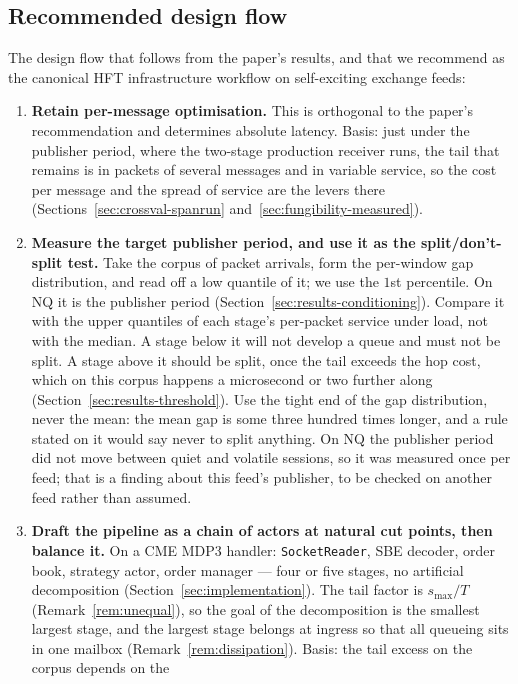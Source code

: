 \documentclass[11pt]{article}
\begin{document}
\subsection{Recommended design flow}

The design flow that follows from the paper's results, and that we recommend as the
canonical HFT infrastructure workflow on self-exciting exchange feeds:
\begin{enumerate}
    \item \textbf{Retain per-message optimisation.} This is orthogonal to the paper's
recommendation and determines absolute latency. Basis: just under the publisher period,
where the two-stage production receiver runs, the tail that remains is in packets of several messages
and in variable service, so the cost per message and the spread of service are the
levers there (Sections~\ref{sec:crossval-spanrun} and~\ref{sec:fungibility-measured}).
    \item \textbf{Measure the target publisher period, and use it as the split/don't-split
test.} Take the corpus of packet arrivals, form the per-window gap distribution, and read
off a low quantile of it; we use the $1$st percentile. On NQ it is the publisher period
(Section~\ref{sec:results-conditioning}). Compare it with the upper quantiles of each
stage's per-packet service under load, not with the median. A stage below it will not
develop a queue and must not be split. A stage above it should be split, once the tail
exceeds the hop cost, which on this corpus happens a microsecond or two further along
(Section~\ref{sec:results-threshold}). Use the tight end of the gap distribution, never
the mean: the mean gap is some three hundred times longer, and a rule stated on it would
say never to split anything. On NQ the publisher period did not move between quiet and
volatile sessions, so it was measured once per feed; that is a finding about this feed's
publisher, to be checked on another feed rather than assumed.
    \item \textbf{Draft the pipeline as a chain of actors at natural cut points, then
balance it.} On a CME MDP3 handler: \texttt{SocketReader}, SBE decoder, order book,
strategy actor, order manager --- four or five stages, no artificial decomposition
(Section~\ref{sec:implementation}). The tail factor is $s_{\max}/T$
(Remark~\ref{rem:unequal}), so the goal of the decomposition is the smallest largest
stage, and the largest stage belongs at ingress so that all queueing sits in one mailbox
(Remark~\ref{rem:dissipation}). Basis: the tail excess on the corpus depends on the

\end{enumerate}
\end{document}
